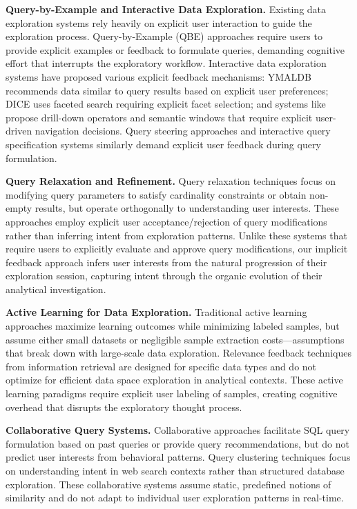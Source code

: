 \documentclass[sigconf, nonacm]{acmart}
\begin{document}
\textbf{Query-by-Example and Interactive Data Exploration.} Existing data exploration systems rely heavily on explicit user interaction to guide the exploration process. Query-by-Example (QBE) approaches require users to provide explicit examples or feedback to formulate queries, demanding cognitive effort that interrupts the exploratory workflow. Interactive data exploration systems have proposed various explicit feedback mechanisms: YMALDB \cite{drosouYmaldbExploringRelational2013} recommends data similar to query results based on explicit user preferences; DICE uses faceted search requiring explicit facet selection; and systems like \cite{kalininInteractiveDataExploration2014} propose drill-down operators and semantic windows that require explicit user-driven navigation decisions. Query steering approaches \cite{ugurcetintemelQuerySteeringInteractive2013} and interactive query specification systems similarly demand explicit user feedback during query formulation.

\textbf{Query Relaxation and Refinement.} Query relaxation techniques focus on modifying query parameters to satisfy cardinality constraints or obtain non-empty results, but operate orthogonally to understanding user interests. These approaches employ explicit user acceptance/rejection of query modifications rather than inferring intent from exploration patterns. Unlike these systems that require users to explicitly evaluate and approve query modifications, our implicit feedback approach infers user interests from the natural progression of their exploration session, capturing intent through the organic evolution of their analytical investigation.

\textbf{Active Learning for Data Exploration.} Traditional active learning approaches maximize learning outcomes while minimizing labeled samples, but assume either small datasets or negligible sample extraction costs—assumptions that break down with large-scale data exploration. Relevance feedback techniques from information retrieval are designed for specific data types and do not optimize for efficient data space exploration in analytical contexts. These active learning paradigms require explicit user labeling of samples, creating cognitive overhead that disrupts the exploratory thought process.

\textbf{Collaborative Query Systems.} Collaborative approaches facilitate SQL query formulation based on past queries or provide query recommendations, but do not predict user interests from behavioral patterns. Query clustering techniques focus on understanding intent in web search contexts rather than structured database exploration. These collaborative systems assume static, predefined notions of similarity and do not adapt to individual user exploration patterns in real-time.
\end{document}
